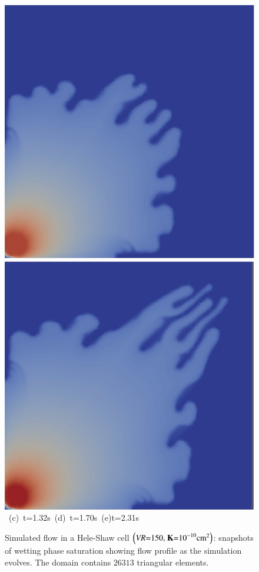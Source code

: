 \begin{landscape}
\begin{figure}[ht]
{{      \includegraphics[width=.5\textwidth]{./Pics1/Saffman_homogeneous_VR150/ST_Homog_VR150_D4000b}
      \includegraphics[width=.51\textwidth]{./Pics1/Saffman_homogeneous_VR150/ST_Homog_VR150_D7000b}}
\vspace{0.cm}
\hbox{ \hspace{2.cm} (c) t=1.32s \hspace{4.5cm} (d) t=1.70s \hspace{5.cm} (e)t=2.31s}
\vspace{0.cm}
}   
\caption{Simulated flow in a Hele-Shaw cell $\left(\text{{\it VR}=150, {\bf K}=10}^{-10}\text{cm}^{2}\right)$: snapshots of wetting phase saturation showing flow profile as the simulation evolves. The domain contains $26313$  triangular elements.}
\label{fig:homoheleshaw_VN150}
\end{figure}
\end{landscape}
\clearpage



